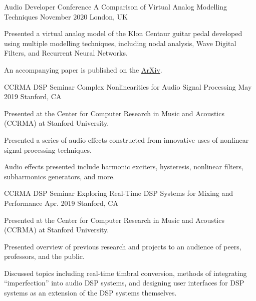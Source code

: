 \begin{cventries}
  \cventry
    {Audio Developer Conference} %
    {A Comparison of Virtual Analog Modelling Techniques} %
    {November 2020} %
    {London, UK} %
    {
      \begin{cvitems} %
        \item {Presented a virtual analog model of the Klon Centaur guitar pedal
               developed using multiple modelling techniques, including nodal
               analysis, Wave Digital Filters, and Recurrent Neural Networks.}
        \item {An accompanying paper is published on the \href{https://arxiv.org/abs/2009.02833}{ArXiv}.}
      \end{cvitems}
    }

  \cventry
    {CCRMA DSP Seminar} %
    {Complex Nonlinearities for Audio Signal Processing} %
    {May 2019} %
    {Stanford, CA} %
    {
      \begin{cvitems} %
        \item {Presented at the Center for Computer Research in Music and Acoustics (CCRMA) at Stanford University.}
        \item {Presented a series of audio effects constructed from
               innovative uses of nonlinear signal processing techniques.}
        \item {Audio effects presented include harmonic exciters, hysteresis,
               nonlinear filters, subharmonics generators, and more.}
      \end{cvitems}
    }

    \cventry
    {CCRMA DSP Seminar} %
    {Exploring Real-Time DSP Systems for Mixing and Performance} %
    {Apr. 2019} %
    {Stanford, CA} %
    {
      \begin{cvitems} %
        \item {Presented at the Center for Computer Research in Music and Acoustics (CCRMA) at Stanford University.}
        \item {Presented overview of previous research and projects to an audience of peers, professors, and the public.}
        \item {Discussed topics including real-time timbral conversion, methods of integrating ``imperfection'' into audio
               DSP systems, and designing user interfaces for DSP systems as an extension of the DSP systems themselves.}
      \end{cvitems}
    }


\end{cventries}
